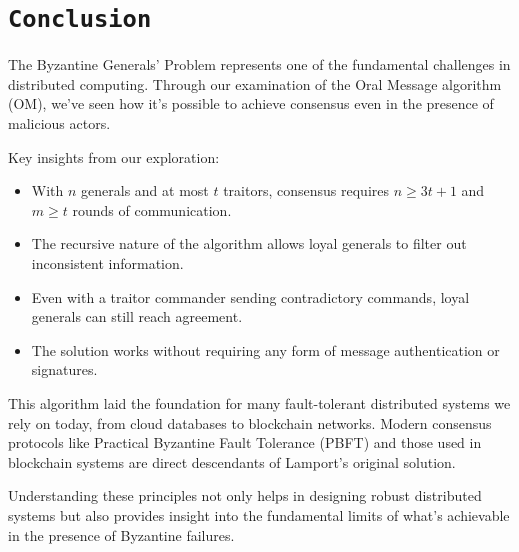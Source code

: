\documentclass[11pt]{article}
\begin{document}
%

\section*{\texttt{\Large Conclusion}}

\justifying
The Byzantine Generals' Problem represents one of the fundamental challenges in distributed computing. Through our examination of the Oral Message algorithm (OM), we've seen how it's possible to achieve consensus even in the presence of malicious actors.

Key insights from our exploration:

\begin{itemize}
    \item With $n$ generals and at most $t$ traitors, consensus requires $n \geq 3t+1$ and $m \geq t$ rounds of communication.
    \item The recursive nature of the algorithm allows loyal generals to filter out inconsistent information.
    \item Even with a traitor commander sending contradictory commands, loyal generals can still reach agreement.
    \item The solution works without requiring any form of message authentication or signatures.
\end{itemize}

This algorithm laid the foundation for many fault-tolerant distributed systems we rely on today, from cloud databases to blockchain networks. Modern consensus protocols like Practical Byzantine Fault Tolerance (PBFT) and those used in blockchain systems are direct descendants of Lamport's original solution.

Understanding these principles not only helps in designing robust distributed systems but also provides insight into the fundamental limits of what's achievable in the presence of Byzantine failures.
\end{document}
